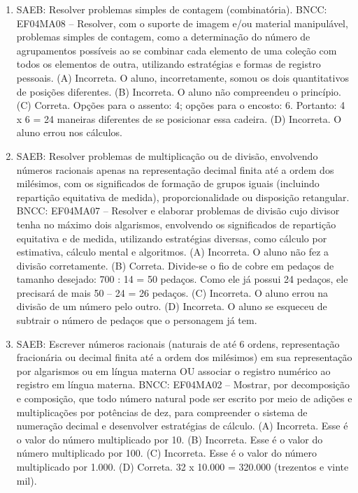 \begin{enumerate}
\item
SAEB: Resolver problemas simples de contagem (combinatória).
BNCC: EF04MA08 -- Resolver, com o suporte de imagem e/ou material manipulável, problemas simples
de contagem, como a determinação do número de agrupamentos possíveis ao se combinar cada
elemento de uma coleção com todos os elementos de outra, utilizando estratégias e formas de
registro pessoais.
(A) Incorreta. O aluno, incorretamente, somou os dois quantitativos de posições diferentes.
(B) Incorreta. O aluno não compreendeu o princípio.
(C) Correta. Opções para o assento: 4; opções para o encosto: 6. Portanto: 4 x 6 = 24 maneiras diferentes de se posicionar essa cadeira.
(D) Incorreta. O aluno errou nos cálculos.

\item
SAEB: Resolver problemas de multiplicação ou de divisão,
envolvendo números racionais apenas na representação decimal finita até
a ordem dos milésimos, com os significados de formação de grupos iguais
(incluindo repartição equitativa de medida), proporcionalidade ou
disposição retangular.
BNCC: EF04MA07 -- Resolver e elaborar problemas de divisão cujo divisor tenha no máximo dois algarismos,
envolvendo os significados de repartição equitativa e de medida, utilizando estratégias diversas,
como cálculo por estimativa, cálculo mental e algoritmos.
(A) Incorreta. O aluno não fez a divisão corretamente.
(B) Correta. Divide-se o fio de cobre em pedaços de tamanho desejado: 700 : 14 = 50
pedaços. Como ele já possui 24 pedaços, ele precisará de mais 50 -- 24 = 26 pedaços.
(C) Incorreta. O aluno errou na divisão de um número pelo outro.
(D) Incorreta. O aluno se esqueceu de subtrair o número de pedaços que o personagem já tem.

\item
SAEB: Escrever números racionais (naturais de até 6 ordens, representação
fracionária ou decimal finita até a ordem dos milésimos) em sua
representação por algarismos ou em língua materna OU associar o registro
numérico ao registro em língua materna.
BNCC: EF04MA02 -- Mostrar, por decomposição e composição, que todo número natural pode ser escrito
por meio de adições e multiplicações por potências de dez, para compreender o sistema de
numeração decimal e desenvolver estratégias de cálculo.
(A) Incorreta. Esse é o valor do número multiplicado por 10.
(B) Incorreta. Esse é o valor do número multiplicado por 100.
(C) Incorreta. Esse é o valor do número multiplicado por 1.000.
(D) Correta. 32 x 10.000 = 320.000 (trezentos e vinte mil).
\end{enumerate}

